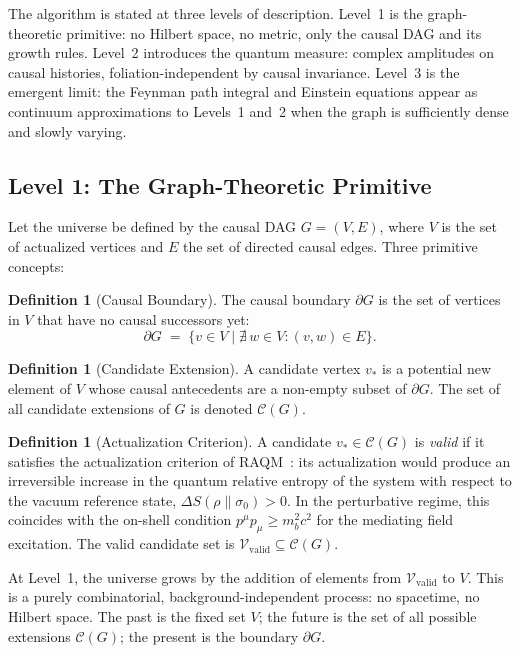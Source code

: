 \documentclass[11pt,a4paper]{article}
\theoremstyle{plain}
\theoremstyle{definition}
\newtheorem{definition}[theorem]{Definition}
\theoremstyle{remark}
\newcommand{\Vvalid}{\mathcal{V}_{\mathrm{valid}}}
\begin{document}
The algorithm is stated at three levels of description. Level~1 is the
graph-theoretic primitive: no Hilbert space, no metric, only the causal DAG
and its growth rules. Level~2 introduces the quantum measure: complex amplitudes
on causal histories, foliation-independent by causal invariance. Level~3 is
the emergent limit: the Feynman path integral and Einstein equations appear
as continuum approximations to Levels~1 and~2 when the graph is sufficiently
dense and slowly varying.

\subsection{Level 1: The Graph-Theoretic Primitive}

Let the universe be defined by the causal DAG $G = (V, E)$, where $V$ is the
set of actualized vertices and $E$ the set of directed causal edges. Three
primitive concepts:

\begin{definition}[Causal Boundary]
The causal boundary $\partial G$ is the set of vertices in $V$ that have no
causal successors yet:
\begin{equation}
  \partial G \;=\; \{v \in V \mid \nexists\, w \in V : (v,w) \in E\}.
  \label{eq:boundary_v2}
\end{equation}
\end{definition}

\begin{definition}[Candidate Extension]
A candidate vertex $v_*$ is a potential new element of $V$ whose causal
antecedents are a non-empty subset of $\partial G$. The set of all candidate
extensions of $G$ is denoted $\mathcal{C}(G)$.
\end{definition}

\begin{definition}[Actualization Criterion]
A candidate $v_* \in \mathcal{C}(G)$ is \emph{valid} if it satisfies the
actualization criterion of RAQM~\citep{Sandeman2026a}: its actualization would
produce an irreversible increase in the quantum relative entropy of the system
with respect to the vacuum reference state, $\Delta S(\rho\|\sigma_0) > 0$.
In the perturbative regime, this coincides with the on-shell condition
$p^\mu p_\mu \geq m_b^2 c^2$ for the mediating field excitation. The valid
candidate set is $\Vvalid \subseteq \mathcal{C}(G)$.
\end{definition}

At Level~1, the universe grows by the addition of elements from $\Vvalid$ to
$V$. This is a purely combinatorial, background-independent process: no
spacetime, no Hilbert space. The past is the fixed set $V$; the future is the
set of all possible extensions $\mathcal{C}(G)$; the present is the boundary
$\partial G$.
\end{document}
